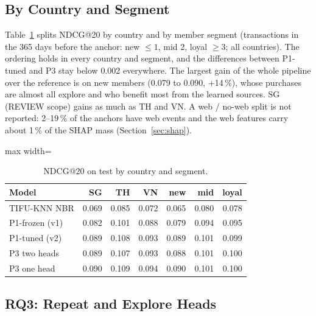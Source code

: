 \documentclass{ieeeaccess}
\begin{document}
\subsection{By Country and Segment}
Table~\ref{tab:segments} splits NDCG@20 by country and by member segment (transactions in the 365 days before the anchor: new
$\le 1$, mid 2, loyal $\ge 3$; all countries). The ordering holds in every country and segment, and the differences between P1-tuned
and P3 stay below 0.002 everywhere. The largest gain of the whole pipeline over the reference is on new members (0.079 to 0.090,
+14\,\%), whose purchases are almost all explore and who benefit most from the learned sources. SG (REVIEW scope) gains as much as TH
and VN. A web / no-web split is not reported: 2--19\,\% of the anchors have web events and the web features carry about 1\,\% of the
SHAP mass (Section~\ref{sec:shap}).

\begin{table}[t]
\caption{NDCG@20 on test by country and segment.}
\label{tab:segments}
\setlength{\tabcolsep}{3pt}
\centering
\begin{adjustbox}{max width=\columnwidth}
\begin{tabular}{lrrrrrr}
\toprule
Model & SG & TH & VN & new & mid & loyal \\
\midrule
TIFU-KNN NBR    & 0.069 & 0.085 & 0.072 & 0.065 & 0.080 & 0.078 \\
P1-frozen (v1)  & 0.082 & 0.101 & 0.088 & 0.079 & 0.094 & 0.095 \\
P1-tuned (v2)   & 0.089 & 0.108 & 0.093 & 0.089 & 0.101 & 0.099 \\
P3 two heads    & 0.089 & 0.107 & 0.093 & 0.088 & 0.101 & 0.100 \\
P3 one head     & 0.090 & 0.109 & 0.094 & 0.090 & 0.101 & 0.100 \\
\bottomrule
\end{tabular}
\end{adjustbox}
\end{table}

\subsection{RQ3: Repeat and Explore Heads}
\end{document}

